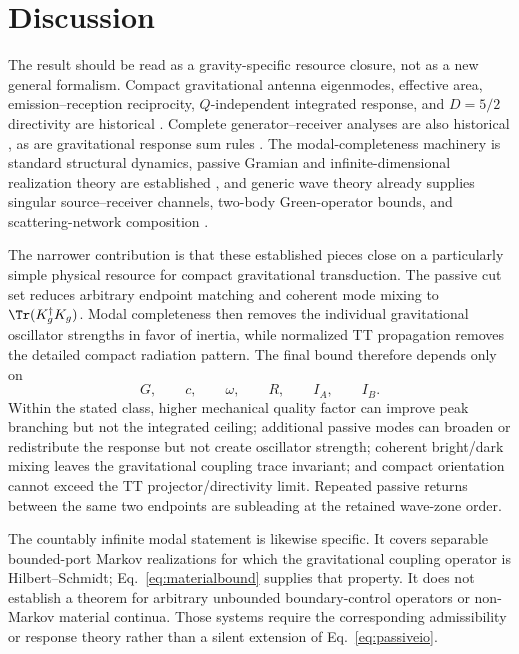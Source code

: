 \section{Discussion}
\label{sec:discussion}

The result should be read as a gravity-specific resource closure, not as a new general formalism. Compact gravitational antenna eigenmodes, effective area, emission--reception reciprocity, $Q$-independent integrated response, and $D=5/2$ directivity are historical \cite{HirakawaNariharaFujimoto1976,PaikWagoner1976}. Complete generator--receiver analyses are also historical \cite{GrishchukSazhin1975,Rudenko2003}, as are gravitational response sum rules \cite{SrivastavaWidomPizzella2003}. The modal-completeness machinery is standard structural dynamics, passive Gramian and infinite-dimensional realization theory are established \cite{GutaYamamoto2014,TechakesariNurdin2017,BarasBrockett1975,OpmeerReisWollner2013}, and generic wave theory already supplies singular source--receiver channels, two-body Green-operator bounds, and scattering-network composition \cite{Miller2000,MoleskyVenkataramJinRodriguez2020,Redheffer1962}.

The narrower contribution is that these established pieces close on a particularly simple physical resource for compact gravitational transduction. The passive cut set reduces arbitrary endpoint matching and coherent mode mixing to $\Tr(K_g^\dagger K_g)$. Modal completeness then removes the individual gravitational oscillator strengths in favor of inertia, while normalized TT propagation removes the detailed compact radiation pattern. The final bound therefore depends only on
\begin{equation}
G,\qquad c,\qquad \omega,\qquad R,\qquad I_A,\qquad I_B.
\end{equation}
Within the stated class, higher mechanical quality factor can improve peak branching but not the integrated ceiling; additional passive modes can broaden or redistribute the response but not create oscillator strength; coherent bright/dark mixing leaves the gravitational coupling trace invariant; and compact orientation cannot exceed the TT projector/directivity limit. Repeated passive returns between the same two endpoints are subleading at the retained wave-zone order.

The countably infinite modal statement is likewise specific. It covers separable bounded-port Markov realizations for which the gravitational coupling operator is Hilbert--Schmidt; Eq.~\eqref{eq:materialbound} supplies that property. It does not establish a theorem for arbitrary unbounded boundary-control operators or non-Markov material continua. Those systems require the corresponding admissibility or response theory rather than a silent extension of Eq.~\eqref{eq:passiveio}.

